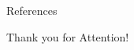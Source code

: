 \documentclass[usenames,dvipsnames]{beamer}
\begin{document}
	\maketitle

	

	\ifthenelse%
		{}
		{\nocite{*}}
		{}

	\begin{frame}[allowframebreaks]{References}

		


	\end{frame}


	\begin{frame}[standout]

		\Huge\alert{Thank you for Attention!}

	\end{frame}

	\maketitle
\end{document}
